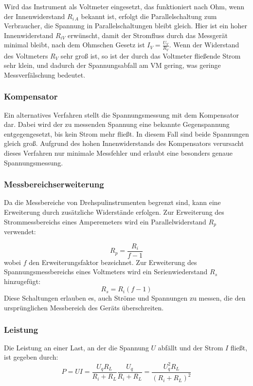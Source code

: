 Wird das Instrument als Voltmeter eingesetzt, das funktioniert nach Ohm, wenn der Innenwiderstand \(R_{i\,A}\) bekannt ist, erfolgt die Parallelschaltung zum Verbraucher, die Spannung in Parallelschaltungen bleibt gleich. Hier ist ein hoher Innenwiderstand \(R_{iV}\) erwünscht, damit der Stromfluss durch das Messgerät minimal bleibt, nach dem Ohmschen Gesetz ist \(I_V=\frac{U_V}{R_V}\). Wenn der Widerstand des Voltmeters \(R_V\) sehr groß ist, so ist der durch das Voltmeter fließende Strom sehr klein, und dadurch der Spannungsabfall am VM gering, was geringe Messverfälschung bedeutet.

\subsubsection{Kompensator}
Ein alternatives Verfahren stellt die Spannungsmessung mit dem Kompensator dar. Dabei wird der zu messenden Spannung eine bekannte Gegenspannung entgegengesetzt, bis kein Strom mehr fließt. In diesem Fall sind beide Spannungen gleich groß. Aufgrund des hohen Innenwiderstands des Kompensators verursacht dieses Verfahren nur minimale Messfehler und erlaubt eine besonders genaue Spannungsmessung.


\subsubsection{Messbereichserweiterung}
Da die Messbereiche von Drehspulinstrumenten begrenzt sind, kann eine Erweiterung durch zusätzliche Widerstände erfolgen. Zur Erweiterung des Strommessbereichs eines Amperemeters wird ein Parallelwiderstand \(R_p\) verwendet:

\begin{equation}
    R_p = \frac{R_i}{f-1}
    \label{eq:stromerw}
\end{equation}
wobei \(f\) den Erweiterungsfaktor bezeichnet. Zur Erweiterung des Spannungsmessbereichs eines Voltmeters wird ein Serienwiederstand \(R_s\) hinzugefügt:
\begin{equation}
    R_s = R_i (f-1)
    \label{eq:spannungserw}
\end{equation}
Diese Schaltungen erlauben es, auch Ströme und Spannungen zu messen, die den ursprünglichen Messbereich des Geräts überschreiten.

\subsubsection{Leistung}
Die Leistung an einer Last, an der die Spannung \(U\) abfällt und der Strom \(I\) fließt, ist gegeben durch:
\begin{equation}
    P=UI=\frac{U_qR_L}{R_i+R_L}\frac{U_q}{R_i+R_L}=\frac{U_q^2R_L}{(R_i+R_L)^2}
\end{equation}
